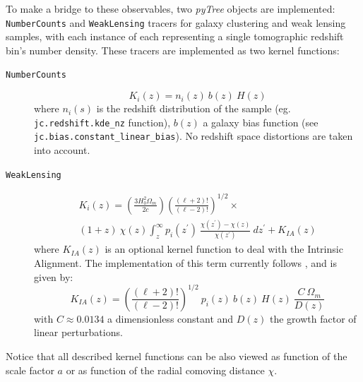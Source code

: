 \documentclass[twocolumn,twocolappendix,nofootinbib,iop]{openjournal}
\begin{document}
To make a bridge to these observables, two \textit{pyTree} objects are implemented: \texttt{NumberCounts} and \texttt{WeakLensing} tracers for galaxy clustering and weak lensing samples, with each instance of each representing a single tomographic redshift bin's number density. These tracers are implemented as two kernel functions:

\begin{description}
\item[\texttt{NumberCounts}]
    \begin{equation}
        K_i(z) = n_i(z)\ b(z)\ H(z)
    \end{equation}
where $n_i(s)$ is the redshift distribution of the sample (eg. \texttt{jc.redshift.kde\_nz} function), $b(z)$ a galaxy bias function (see  \texttt{jc.bias.constant\_linear\_bias}). No redshift space distortions are taken into account.

\item [\texttt{WeakLensing}]
    \begin{multline}
 K_i(z) = \left( \frac{3 H_0^2\Omega_m}{2 c} \right) \left(\frac{(\ell+2)!}{(\ell-2)!} \right)^{1/2}\times 
 \\  (1+z)\ \chi(z) \int_z^\infty p_i(z^\prime)\ \frac{\chi(z^\prime)-\chi(z)}{\chi(z^\prime)}\ dz^\prime + K_{IA}(z)
    \end{multline}
where $K_{IA}(z)$ is an optional kernel function to deal with the Intrinsic Alignment. The implementation of this term currently follows \citet{2011A&A...527A..26J}, and is given by:
\begin{equation}
    K_{IA}(z) =   \left(\frac{(\ell+2)!}{(\ell-2)!}\right)^{1/2}\ p_i(z)\ b(z)\  H(z)\ \frac{C\  \Omega_m}{D(z)}
\end{equation}
with $C\approx 0.0134$ a dimensionless constant and $D(z)$ the growth factor of linear perturbations.
\end{description}

Notice that all described kernel functions can be also viewed as function of the scale factor $a$ or as function of the radial comoving distance $\chi$. 
\end{document}
